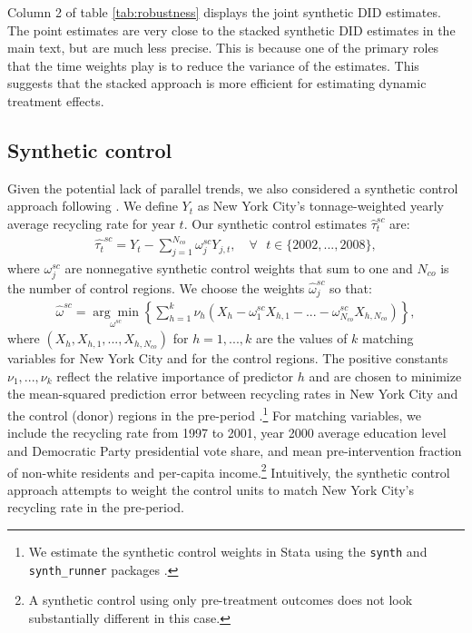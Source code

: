 \documentclass[12pt]{article}
\begin{document}
Column 2 of table \ref{tab:robustness} displays the joint synthetic DID estimates.  The point estimates are very close to the stacked synthetic DID estimates in the main text, but are much less precise.  This is because one of the primary roles that the time weights play is to reduce the variance of the estimates.  This suggests that the stacked approach is more efficient for estimating dynamic treatment effects.

\subsection{Synthetic control} \label{sec:sc}

Given the potential lack of parallel trends, we also considered a synthetic control approach following \cite{abadie2021}.  We define \(Y_t\) as New York City's tonnage-weighted yearly average recycling rate for year \(t\).  Our synthetic control estimates \(\hat{\tau}_t^{sc}\) are:
\begin{align} \label{eq:sc}
    \hat{\tau_t}^{sc} = Y_t - \sum_{j=1}^{N_{co}} \omega^{sc}_j Y_{j,t}, \quad \forall \text{ } t \in \lbrace 2002,...,2008 \rbrace,
\end{align}
where \(\omega^{sc}_j\) are nonnegative synthetic control weights that sum to one and \(N_{co}\) is the number of control regions.  We choose the weights \(\hat{\omega}^{sc}_j\) so that:
\begin{align}
    \hat{\omega}^{sc} = \underset{\omega^{sc}}{\arg\min} \left\lbrace \sum_{h=1}^{k} \nu_h (X_h-\omega^{sc}_1 X_{h,1}-...-\omega^{sc}_{N_{co}} X_{h,N_{co}}) \right\rbrace,
\end{align}
where \((X_h,X_{h,1},...,X_{h,N_{co}})\) for \(h=1,...,k\) are the values of \(k\) matching variables for New York City and for the control regions.  The positive constants \(\nu_1,...,\nu_k\) reflect the relative importance of predictor \(h\) and are chosen to minimize the mean-squared prediction error between recycling rates in New York City and the control (donor) regions in the pre-period \citep{abadie2010}.\footnote{We estimate the synthetic control weights in Stata using the \verb+synth+ and \verb+synth_runner+ packages \citep{galianiquistorff2017}.}  For matching variables, we include the recycling rate from 1997 to 2001, year 2000 average education level and Democratic Party presidential vote share, and mean pre-intervention fraction of non-white residents and per-capita income.\footnote{A synthetic control using only pre-treatment outcomes does not look substantially different in this case.}  Intuitively, the synthetic control approach attempts to weight the control units to match New York City's recycling rate in the pre-period.
\end{document}
